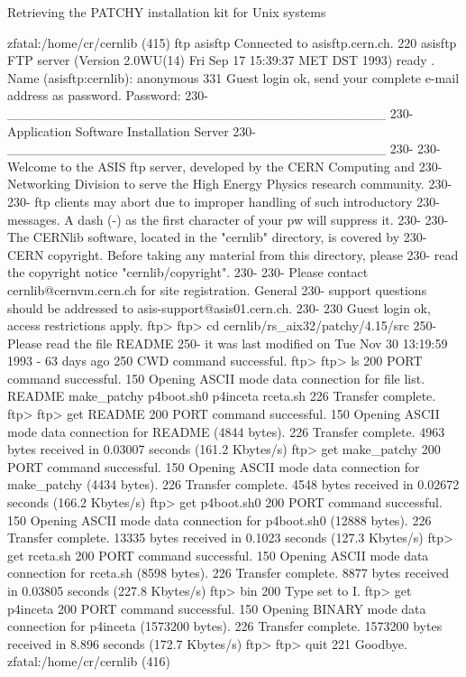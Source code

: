 \begin{XMPt}{Retrieving the PATCHY installation kit for Unix systems}

zfatal:/home/cr/cernlib (415) ftp asisftp
Connected to asisftp.cern.ch.
220 asisftp FTP server (Version 2.0WU(14) Fri Sep 17 15:39:37 MET DST 1993) ready
.
Name (asisftp:cernlib): anonymous
331 Guest login ok, send your complete e-mail address as password.
Password:
230-                   ________________________________________
230-                   Application Software Installation Server
230-                   ________________________________________
230-
230-   Welcome to the ASIS ftp server, developed by the CERN Computing and
230-   Networking Division to serve the High Energy Physics research community.
230-
230-   ftp clients may abort due to improper handling of such introductory
230-   messages. A dash (-) as the first character of your pw will suppress it.
230-
230-   The CERNlib software, located in the "cernlib" directory, is covered by
230-   CERN copyright. Before taking any material from this directory, please
230-   read the copyright notice "cernlib/copyright".
230-
230-   Please contact cernlib@cernvm.cern.ch for site registration. General
230-   support questions should be addressed to asis-support@asis01.cern.ch. 
230-
230 Guest login ok, access restrictions apply.
ftp> 
ftp> cd cernlib/rs_aix32/patchy/4.15/src
250-Please read the file README
250-  it was last modified on Tue Nov 30 13:19:59 1993 - 63 days ago
250 CWD command successful.
ftp> 
ftp> ls 
200 PORT command successful.
150 Opening ASCII mode data connection for file list.
README
make_patchy
p4boot.sh0
p4inceta
rceta.sh
226 Transfer complete.
ftp> 
ftp> get README
200 PORT command successful.
150 Opening ASCII mode data connection for README (4844 bytes).
226 Transfer complete.
4963 bytes received in 0.03007 seconds (161.2 Kbytes/s)
ftp> get make_patchy
200 PORT command successful.
150 Opening ASCII mode data connection for make_patchy (4434 bytes).
226 Transfer complete.
4548 bytes received in 0.02672 seconds (166.2 Kbytes/s)
ftp> get p4boot.sh0
200 PORT command successful.
150 Opening ASCII mode data connection for p4boot.sh0 (12888 bytes).
226 Transfer complete.
13335 bytes received in 0.1023 seconds (127.3 Kbytes/s)
ftp> get rceta.sh
200 PORT command successful.
150 Opening ASCII mode data connection for rceta.sh (8598 bytes).
226 Transfer complete.
8877 bytes received in 0.03805 seconds (227.8 Kbytes/s)
ftp> bin
200 Type set to I.
ftp> get p4inceta
200 PORT command successful.
150 Opening BINARY mode data connection for p4inceta (1573200 bytes).
226 Transfer complete.
1573200 bytes received in 8.896 seconds (172.7 Kbytes/s)
ftp> 
ftp> quit
221 Goodbye.
zfatal:/home/cr/cernlib (416) 

\end{XMPt}

